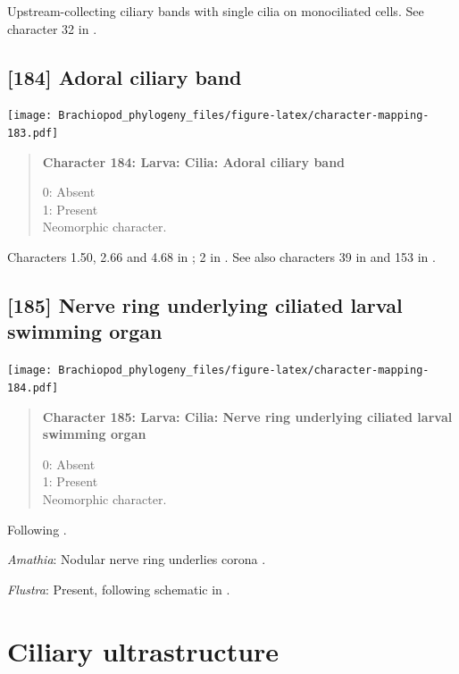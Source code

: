 \documentclass[openany]{book}
\begin{document}
Upstream-collecting ciliary bands with single cilia on monociliated
cells. See character 32 in \citet{Glenner2004}.

\subsection*{{[}184{]} Adoral ciliary band}\label{adoral-ciliary-band}

\texttt{[image: Brachiopod\_phylogeny\_files/figure-latex/character-mapping-183.pdf]}

\begin{quote}
\textbf{Character 184: Larva: Cilia: Adoral ciliary band}

0: Absent\\
1: Present\\
Neomorphic character.
\end{quote}

Characters 1.50, 2.66 and 4.68 in \citet{SPS1996}; 2 in
\citet{Vinther2008}. See also characters 39 in \citet{Haszprunar1996}
and 153 in \citet{Giribet2002}.

\subsection*{{[}185{]} Nerve ring underlying ciliated larval swimming
organ}\label{nerve-ring-underlying-ciliated-larval-swimming-organ}

\texttt{[image: Brachiopod\_phylogeny\_files/figure-latex/character-mapping-184.pdf]}

\begin{quote}
\textbf{Character 185: Larva: Cilia: Nerve ring underlying ciliated
larval swimming organ}

0: Absent\\
1: Present\\
Neomorphic character.
\end{quote}

Following \citet{Wanninger2009}.

\hypertarget{Amathia-coding-185}{}
\emph{Amathia}: Nodular nerve ring underlies corona \citep{Reed1982}.

\hypertarget{Flustra-coding-185}{}
\emph{Flustra}: Present, following schematic in \citet{Gruhl2016}.

\section{Ciliary ultrastructure}\label{ciliary-ultrastructure}
\end{document}

